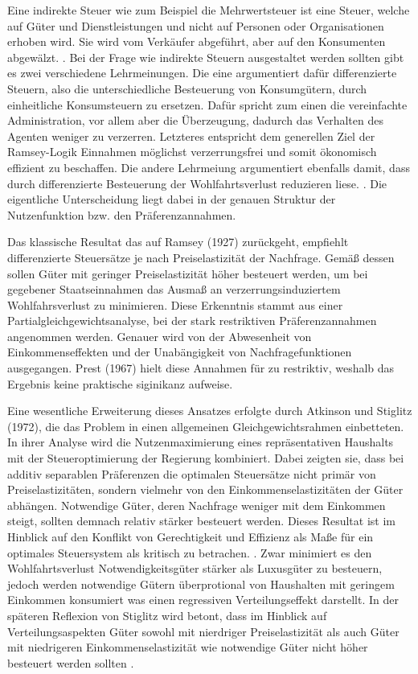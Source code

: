 Eine indirekte Steuer wie zum Beispiel die Mehrwertsteuer ist eine Steuer, welche auf Güter und Dienstleistungen und nicht auf Personen oder Organisationen erhoben wird. Sie wird vom Verkäufer abgeführt, aber auf den Konsumenten abgewälzt. \cite{Samuelson}. 
Bei der Frage wie indirekte Steuern ausgestaltet werden sollten gibt es zwei verschiedene Lehrmeinungen. Die eine argumentiert dafür differenzierte Steuern, also die unterschiedliche Besteuerung von Konsumgütern, durch einheitliche Konsumsteuern zu ersetzen. Dafür spricht zum einen die vereinfachte Administration, vor allem aber die Überzeugung, dadurch das Verhalten des Agenten weniger zu verzerren. Letzteres entspricht dem generellen Ziel der Ramsey-Logik Einnahmen möglichst verzerrungsfrei und somit ökonomisch effizient zu beschaffen. Die andere Lehrmeiung argumentiert ebenfalls damit, dass durch differenzierte Besteuerung der Wohlfahrtsverlust reduzieren liese.    \cite{AtkinsonStiglitz1972}. Die eigentliche Unterscheidung liegt dabei in der genauen Struktur der Nutzenfunktion bzw. den Präferenzannahmen. 

Das klassische Resultat das auf Ramsey (1927) zurückgeht, empfiehlt differenzierte Steuersätze je nach Preiselastizität der Nachfrage. Gemäß dessen sollen Güter mit geringer Preiselastizität höher besteuert werden, um bei gegebener Staatseinnahmen das Ausmaß an verzerrungsinduziertem Wohlfahrsverlust zu minimieren. Diese Erkenntnis stammt aus einer Partialgleichgewichtsanalyse, bei der stark restriktiven Präferenzannahmen angenommen werden. Genauer wird von der Abwesenheit von Einkommenseffekten und der Unabängigkeit von Nachfragefunktionen ausgegangen. Prest (1967) hielt diese Annahmen für zu restriktiv, weshalb das Ergebnis keine praktische siginikanz aufweise. 

Eine wesentliche Erweiterung dieses Ansatzes erfolgte durch Atkinson und Stiglitz (1972), die das Problem in einen allgemeinen Gleichgewichtsrahmen einbetteten. In ihrer Analyse wird die Nutzenmaximierung eines repräsentativen Haushalts mit der Steueroptimierung der Regierung kombiniert. Dabei zeigten sie, dass bei additiv separablen Präferenzen die optimalen Steuersätze nicht primär von Preiselastizitäten, sondern vielmehr von den Einkommenselastizitäten der Güter abhängen. Notwendige Güter, deren Nachfrage weniger mit dem Einkommen steigt, sollten demnach relativ stärker besteuert werden. Dieses Resultat ist im Hinblick auf den Konflikt von Gerechtigkeit und Effizienz als Maße für ein optimales Steuersystem als kritisch zu betrachen. \cite{AtkinsonStiglitz1972}. Zwar minimiert es den Wohlfahrtsverlust Notwendigkeitsgüter stärker als Luxusgüter zu besteuern, jedoch werden notwendige Gütern überprotional von Haushalten mit geringem Einkommen konsumiert was einen regressiven Verteilungseffekt darstellt. In der späteren Reflexion von Stiglitz wird betont, dass im Hinblick auf Verteilungsaspekten Güter sowohl mit nierdriger Preiselastizität als auch Güter mit niedrigeren Einkommenselastizität wie notwendige Güter nicht höher besteuert werden sollten \cite{Sitglitz, 2018}. 

